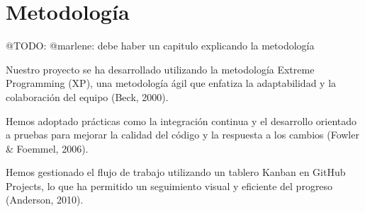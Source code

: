 \chapter{Metodología}\label{ch:chapter_3}

\begin{comment}
    Describe de manera clara el método/metodología empleado para cumplir los objetivos. Los métodos, procedimientos,
    materiales y equipos utilizados deben describirse con suficiente precisión y detalle como para que el trabajo sea
    reproducible por otros profesionales del área. Deben mencionarse las razones por las cuales fue seleccionada la
    metodología empleada y las limitaciones en la aplicación de la metodología en caso de existir.

    Puede incluir métodos de desarrollo de software, técnicas de análisis de datos, algoritmos, metodologías ágiles,
    diseño de experimentos, entre otros. Describe cómo utilizarás estos métodos para abordar tu problema de
    investigación o alcanzar tus objetivos.
\end{comment}

\colorbox{color_highlight}{@TODO: @marlene:}  debe haber un capitulo explicando la metodología

Nuestro proyecto se ha desarrollado utilizando la metodología Extreme
Programming (XP), una metodología ágil que enfatiza la adaptabilidad y la colaboración del equipo (Beck, 2000).

Hemos adoptado prácticas como la integración continua y el desarrollo orientado a pruebas para mejorar la
calidad del código y la respuesta a los cambios (Fowler \& Foemmel, 2006).

Hemos gestionado el flujo de trabajo utilizando un tablero Kanban en GitHub Projects, lo que ha permitido un seguimiento
visual y eficiente del progreso (Anderson, 2010).